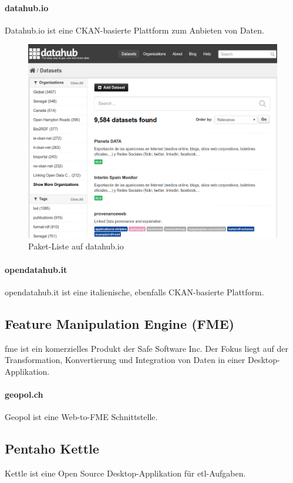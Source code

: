 \paragraph{datahub.io}
Datahub.io ist eine CKAN-basierte Plattform zum Anbieten von Daten.

\begin{figure}[H]
    \centering
    \includegraphics[width=2\linewidth/3]{fig/datahub-io}
    \caption{Paket-Liste auf datahub.io}
\end{figure}

\paragraph{opendatahub.it}
opendatahub.it ist eine italienische, ebenfalls CKAN-basierte Plattform.

\subsection{Feature Manipulation Engine (FME)}
\gls{fme} ist ein komerzielles Produkt der Safe Software Inc. Der Fokus liegt auf der Transformation, Konvertierung und Integration von Daten in einer Desktop-Applikation.

\paragraph{geopol.ch}
Geopol ist eine Web-to-FME Schnittstelle.

\subsection{Pentaho Kettle}
Kettle ist eine Open Source Desktop-Applikation für \acs{etl}-Aufgaben.

